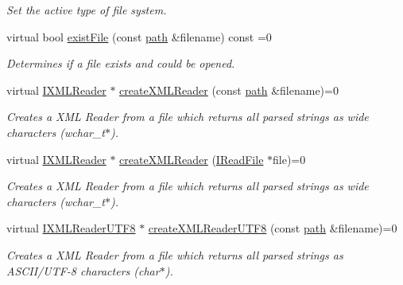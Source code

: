 \begin{DoxyCompactItemize}
\begin{DoxyCompactList}\small\item\em Set the active type of file system. \end{DoxyCompactList}\item 
virtual bool \hyperlink{classirr_1_1io_1_1IFileSystem_a4a4c1c4db3d58c6aff068ff0c8c241b0}{exist\+File} (const \hyperlink{namespaceirr_1_1io_ab1bdc45edb3f94d8319c02bc0f840ee1}{path} \&filename) const  =0
\begin{DoxyCompactList}\small\item\em Determines if a file exists and could be opened. \end{DoxyCompactList}\item 
virtual \hyperlink{namespaceirr_1_1io_a9dc6291fb7e4c73155a3e3c8339f9bff}{I\+X\+M\+L\+Reader} $\ast$ \hyperlink{classirr_1_1io_1_1IFileSystem_a167c9fa159d16ee5c56c074636b0865e}{create\+X\+M\+L\+Reader} (const \hyperlink{namespaceirr_1_1io_ab1bdc45edb3f94d8319c02bc0f840ee1}{path} \&filename)=0
\begin{DoxyCompactList}\small\item\em Creates a X\+ML Reader from a file which returns all parsed strings as wide characters (wchar\+\_\+t$\ast$). \end{DoxyCompactList}\item 
virtual \hyperlink{namespaceirr_1_1io_a9dc6291fb7e4c73155a3e3c8339f9bff}{I\+X\+M\+L\+Reader} $\ast$ \hyperlink{classirr_1_1io_1_1IFileSystem_a38f4c90db3fd1b21473ce0cd2437bb59}{create\+X\+M\+L\+Reader} (\hyperlink{classirr_1_1io_1_1IReadFile}{I\+Read\+File} $\ast$file)=0
\begin{DoxyCompactList}\small\item\em Creates a X\+ML Reader from a file which returns all parsed strings as wide characters (wchar\+\_\+t$\ast$). \end{DoxyCompactList}\item 
virtual \hyperlink{namespaceirr_1_1io_a2dedc8156931082e6b147b562195e310}{I\+X\+M\+L\+Reader\+U\+T\+F8} $\ast$ \hyperlink{classirr_1_1io_1_1IFileSystem_affd8f622ac7c3dcd507f20f9cd23b21f}{create\+X\+M\+L\+Reader\+U\+T\+F8} (const \hyperlink{namespaceirr_1_1io_ab1bdc45edb3f94d8319c02bc0f840ee1}{path} \&filename)=0
\begin{DoxyCompactList}\small\item\em Creates a X\+ML Reader from a file which returns all parsed strings as A\+S\+C\+I\+I/\+U\+T\+F-\/8 characters (char$\ast$). \end{DoxyCompactList}\item 

\end{DoxyCompactItemize}
